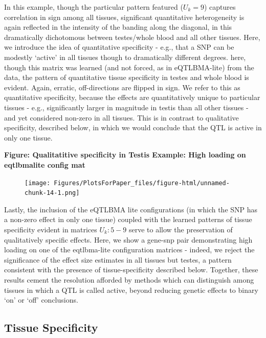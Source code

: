 In this example, though the particular pattern featured ($U_{k}=9$) captures correlation in sign among all tissues, significant quantitative heterogeneity is again reflected in the intensity of the banding along the diagonal, in this dramatically dichotomous between testes/whole blood and all other tissues. Here, we introduce the idea of quantitative specificity - e.g., that a SNP can be modestly `active' in all tissues though to dramatically different degrees. here, though this matrix was learned (and not forced, as in eQTLBMA-lite) from the data, the pattern of quantitative tissue specificity in testes and whole blood is evident. Again, erratic, off-directions are flipped in sign. We refer to this as quantitative specificity, because the effects are quantitatively unique to particular tissues - e.g., significantly larger in magnitude in testis than all other tissues - and yet considered non-zero in all tissues. This is in contrast to qualitative specificity, described below, in which we would conclude that the QTL is active in only one tissue. \newline



\textbf{Figure: Qualitatitive specificity in Testis Example: High loading on eqtlbmalite config mat}
\newline
\begin{figure}[htbp]
\texttt{[image: Figures/PlotsForPaper\_files/figure-html/unnamed-chunk-14-1.png]}\\
\end{figure}\newline

Lastly, the inclusion of the eQTLBMA lite configurations (in which the SNP has a non-zero effect in only one tissue) coupled with the learned patterns of tissue specificity evident in matrices $U_{k}: 5-9$ serve to allow the preservation of qualitatively specific effects. Here, we show a gene-snp pair demonstrating high loading on one of the eqtlbma-lite configuration matrices - indeed, we reject the significance of the effect size estimates in all tissues but testes, a pattern consistent with the presence of tissue-specificity described below. Together, these results cement the resolution afforded by methods which can distinguish among tissues in which a QTL is called active, beyond reducing genetic effects to binary `on' or `off' conclusions.


\subsection{Tissue Specificity}


